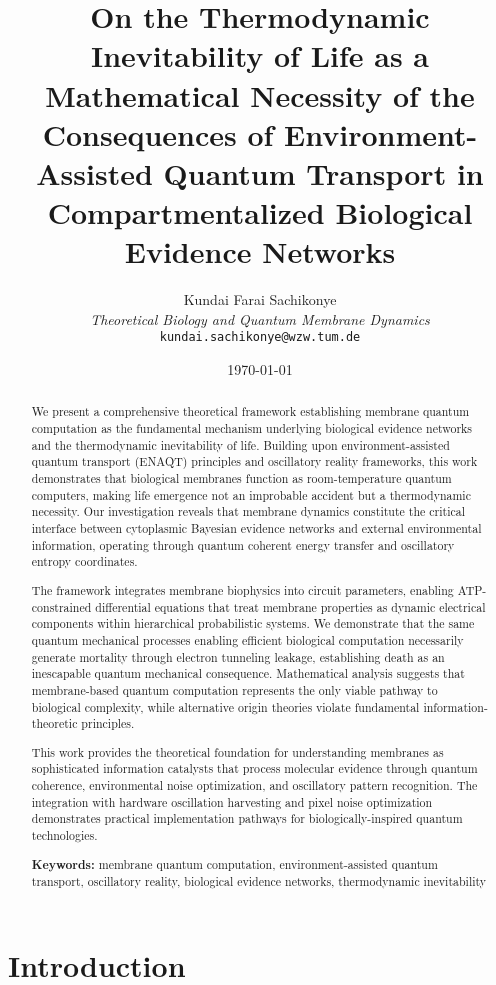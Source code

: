 \documentclass[12pt,a4paper]{article}
\title{\textbf{On the Thermodynamic Inevitability of Life as a Mathematical Necessity of the Consequences of Environment-Assisted Quantum Transport in Compartmentalized Biological Evidence Networks}}
\author{
Kundai Farai Sachikonye\\
\textit{Theoretical Biology and Quantum Membrane Dynamics}\\
\texttt{kundai.sachikonye@wzw.tum.de}
}
\date{\today}
\begin{document}
\maketitle

\begin{abstract}
We present a comprehensive theoretical framework establishing membrane quantum computation as the fundamental mechanism underlying biological evidence networks and the thermodynamic inevitability of life. Building upon environment-assisted quantum transport (ENAQT) principles and oscillatory reality frameworks, this work demonstrates that biological membranes function as room-temperature quantum computers, making life emergence not an improbable accident but a thermodynamic necessity. Our investigation reveals that membrane dynamics constitute the critical interface between cytoplasmic Bayesian evidence networks and external environmental information, operating through quantum coherent energy transfer and oscillatory entropy coordinates.

The framework integrates membrane biophysics into circuit parameters, enabling ATP-constrained differential equations that treat membrane properties as dynamic electrical components within hierarchical probabilistic systems. We demonstrate that the same quantum mechanical processes enabling efficient biological computation necessarily generate mortality through electron tunneling leakage, establishing death as an inescapable quantum mechanical consequence. Mathematical analysis suggests that membrane-based quantum computation represents the only viable pathway to biological complexity, while alternative origin theories violate fundamental information-theoretic principles.

This work provides the theoretical foundation for understanding membranes as sophisticated information catalysts that process molecular evidence through quantum coherence, environmental noise optimization, and oscillatory pattern recognition. The integration with hardware oscillation harvesting and pixel noise optimization demonstrates practical implementation pathways for biologically-inspired quantum technologies.

\textbf{Keywords:} membrane quantum computation, environment-assisted quantum transport, oscillatory reality, biological evidence networks, thermodynamic inevitability
\end{abstract}

\section{Introduction}
\end{document}
